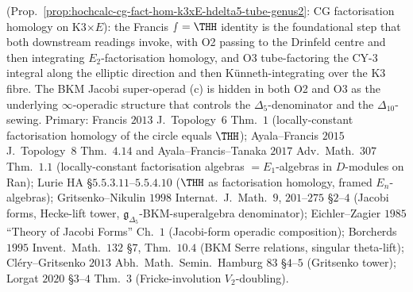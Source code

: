 \begin{proposition}
(Prop.~\ref{prop:hochcalc-cg-fact-hom-k3xE-hdelta5-tube-genus2}: CG
factorisation homology on K3$\times E$): the Francis $\smallint=\THH$
identity is the foundational step that both downstream readings
invoke, with O2 passing to the Drinfeld centre and then integrating
$E_2$-factorisation homology, and O3 tube-factoring the CY-$3$
integral along the elliptic direction and then K\"unneth-integrating
over the K3 fibre. The BKM Jacobi super-operad (c) is hidden in both
O2 and O3 as the underlying $\infty$-operadic structure that controls
the $\Delta_5$-denominator and the $\Delta_{10}$-sewing. Primary:
Francis $2013$ J.\ Topology~$6$ Thm.\ $1$ (locally-constant
factorisation homology of the circle equals $\THH$); Ayala--Francis
$2015$ J.\ Topology~$8$ Thm.\ $4.14$ and Ayala--Francis--Tanaka $2017$
Adv.\ Math.\ $307$ Thm.\ $1.1$ (locally-constant factorisation
algebras $=E_1$-algebras in $D$-modules on Ran); Lurie HA
\S$5.5.3.11$--$5.5.4.10$ ($\THH$ as factorisation homology, framed
$E_n$-algebras); Gritsenko--Nikulin $1998$ Internat.\ J.\ Math.\ $9$, $201$--$275$
\S$2$--$4$ (Jacobi forms, Hecke-lift tower,
$\mathfrak g_{\Delta_5}$-BKM-superalgebra denominator); Eichler--Zagier $1985$ ``Theory of Jacobi Forms'' Ch.\
$1$ (Jacobi-form operadic composition); Borcherds $1995$ Invent.\
Math.\ $132$ \S$7$, Thm.\ $10.4$ (BKM Serre relations, singular
theta-lift); Cl\'ery--Gritsenko $2013$ Abh.\ Math.\ Semin.\ Hamburg
$83$ \S$4$--$5$ (Gritsenko tower); Lorgat $2020$ \S$3$--$4$ Thm.\ $3$
(Fricke-involution $V_2$-doubling).
\end{proposition}

